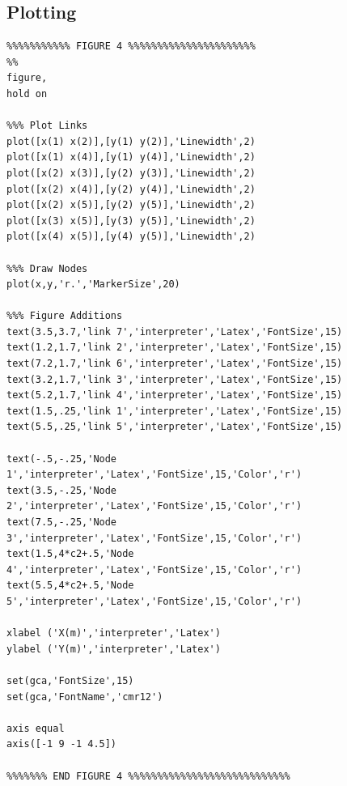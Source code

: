 \documentclass[12pt]{article}
\begin{document}
\subsection{Plotting}
\begin{verbatim}
%%%%%%%%%%% FIGURE 4 %%%%%%%%%%%%%%%%%%%%%%
%%
figure,
hold on

%%% Plot Links
plot([x(1) x(2)],[y(1) y(2)],'Linewidth',2)
plot([x(1) x(4)],[y(1) y(4)],'Linewidth',2)
plot([x(2) x(3)],[y(2) y(3)],'Linewidth',2)
plot([x(2) x(4)],[y(2) y(4)],'Linewidth',2)
plot([x(2) x(5)],[y(2) y(5)],'Linewidth',2)
plot([x(3) x(5)],[y(3) y(5)],'Linewidth',2)
plot([x(4) x(5)],[y(4) y(5)],'Linewidth',2)

%%% Draw Nodes
plot(x,y,'r.','MarkerSize',20)

%%% Figure Additions
text(3.5,3.7,'link 7','interpreter','Latex','FontSize',15)
text(1.2,1.7,'link 2','interpreter','Latex','FontSize',15)
text(7.2,1.7,'link 6','interpreter','Latex','FontSize',15)
text(3.2,1.7,'link 3','interpreter','Latex','FontSize',15)
text(5.2,1.7,'link 4','interpreter','Latex','FontSize',15)
text(1.5,.25,'link 1','interpreter','Latex','FontSize',15)
text(5.5,.25,'link 5','interpreter','Latex','FontSize',15)

text(-.5,-.25,'Node 1','interpreter','Latex','FontSize',15,'Color','r')
text(3.5,-.25,'Node 2','interpreter','Latex','FontSize',15,'Color','r')
text(7.5,-.25,'Node 3','interpreter','Latex','FontSize',15,'Color','r')
text(1.5,4*c2+.5,'Node 4','interpreter','Latex','FontSize',15,'Color','r')
text(5.5,4*c2+.5,'Node 5','interpreter','Latex','FontSize',15,'Color','r')

xlabel ('X(m)','interpreter','Latex')
ylabel ('Y(m)','interpreter','Latex')

set(gca,'FontSize',15)
set(gca,'FontName','cmr12')

axis equal
axis([-1 9 -1 4.5])

%%%%%%% END FIGURE 4 %%%%%%%%%%%%%%%%%%%%%%%%%%%%
\end{verbatim}


		
\end{document}
